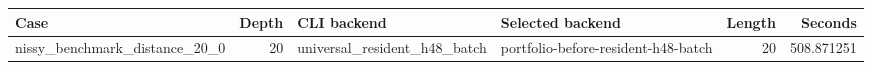 {\small
\begin{tabular}{lrllrr}
\hline
Case & Depth & CLI backend & Selected backend & Length & Seconds \\
\hline
nissy\_benchmark\_distance\_20\_0 & 20 & universal\_resident\_h48\_batch & portfolio-before-resident-h48-batch & 20 & 508.871251 \\
\hline
\end{tabular}
}
